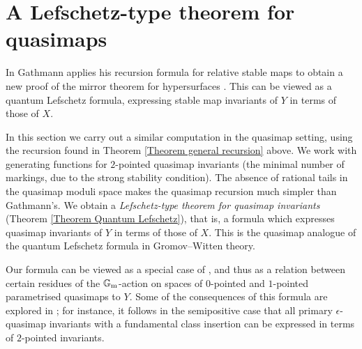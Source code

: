 \section{A Lefschetz-type theorem for quasimaps} \label{Section quasimap mirror theorem}

In \cite{Ga-MF} Gathmann applies his recursion formula for relative stable maps to obtain a new proof of the mirror theorem for hypersurfaces \cite{Givental-mirror} \cite{LLY1}. This can be viewed as a quantum Lefschetz formula, expressing stable map invariants of $Y$ in terms of those of $X$.

In this section we carry out a similar computation in the quasimap setting, using the recursion found in Theorem \ref{Theorem general recursion} above. We work with generating functions for $2$-pointed quasimap invariants (the minimal number of markings, due to the strong stability condition). The absence of rational tails in the quasimap moduli space makes the quasimap recursion much simpler than Gathmann's. We obtain a \emph{Lefschetz-type theorem for quasimap invariants} (Theorem \ref{Theorem Quantum Lefschetz}), that is, a formula which expresses quasimap invariants of $Y$ in terms of those of $X$. This is the quasimap analogue of the quantum Lefschetz formula in Gromov--Witten theory.

Our formula can be viewed as a special case of \cite[Corollary 5.5.1]{CF-K-wallcrossing}, and thus as a relation between certain residues of the $\mathbb{G}_{\text{m}}$-action on spaces of $0$-pointed and $1$-pointed parametrised quasimaps to $Y$. Some of the consequences of this formula are explored in \cite[Section 5.5]{CF-K-wallcrossing}; for instance, it follows in the semipositive case that all primary $\epsilon$-quasimap invariants with a fundamental class insertion can be expressed in terms of $2$-pointed invariants.


